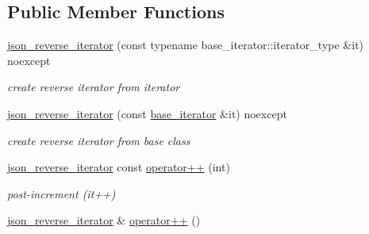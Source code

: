 \subsection*{Public Member Functions}
\begin{DoxyCompactItemize}
\item 
\mbox{\label{classnlohmann_1_1detail_1_1json__reverse__iterator_a0246de16ece16293f2917dfa5d96e278}} 
\hyperlink{classnlohmann_1_1detail_1_1json__reverse__iterator_a0246de16ece16293f2917dfa5d96e278}{json\+\_\+reverse\+\_\+iterator} (const typename base\+\_\+iterator\+::iterator\+\_\+type \&it) noexcept
\begin{DoxyCompactList}\small\item\em create reverse iterator from iterator \end{DoxyCompactList}\item 
\mbox{\label{classnlohmann_1_1detail_1_1json__reverse__iterator_a6c2d025530114ed989188e8adfc8467e}} 
\hyperlink{classnlohmann_1_1detail_1_1json__reverse__iterator_a6c2d025530114ed989188e8adfc8467e}{json\+\_\+reverse\+\_\+iterator} (const \hyperlink{classnlohmann_1_1detail_1_1json__reverse__iterator_a6b2ef1d632fe49bfcc22fbd1abd62395}{base\+\_\+iterator} \&it) noexcept
\begin{DoxyCompactList}\small\item\em create reverse iterator from base class \end{DoxyCompactList}\item 
\mbox{\label{classnlohmann_1_1detail_1_1json__reverse__iterator_aada9d2b320002ef870c5283cda2c1e9d}} 
\hyperlink{classnlohmann_1_1detail_1_1json__reverse__iterator}{json\+\_\+reverse\+\_\+iterator} const \hyperlink{classnlohmann_1_1detail_1_1json__reverse__iterator_aada9d2b320002ef870c5283cda2c1e9d}{operator++} (int)
\begin{DoxyCompactList}\small\item\em post-\/increment (it++) \end{DoxyCompactList}\item 
\mbox{\label{classnlohmann_1_1detail_1_1json__reverse__iterator_a26caf0069a50ce4ecb010a1453e883fc}} 
\hyperlink{classnlohmann_1_1detail_1_1json__reverse__iterator}{json\+\_\+reverse\+\_\+iterator} \& \hyperlink{classnlohmann_1_1detail_1_1json__reverse__iterator_a26caf0069a50ce4ecb010a1453e883fc}{operator++} ()

\end{DoxyCompactItemize}
